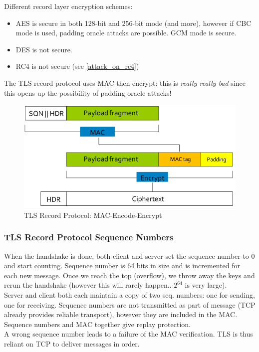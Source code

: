 \documentclass[11pt,oneside,a4paper]{article}
\begin{document}
Different record layer encryption schemes:

\vspace{-\topsep}
\begin{itemize}
	\setlength{\itemsep}{0pt}
	\setlength{\parskip}{0pt}
	\item AES is secure in both 128-bit and 256-bit mode (and more), however if CBC mode is used, padding oracle attacks are possible. GCM mode is secure.
	\item DES is not secure.
	\item RC4 is not secure (see \ref{attack_on_rc4})
\end{itemize}
\vspace{-\topsep}

The TLS record protocol uses MAC-then-encrypt: this is \textit{really really bad} since this opens up the possibility of padding oracle attacks!

\begin{figure}[hb]
	\centering
	\includegraphics[width=0.4\linewidth]{figures/tls_record_protocol}
	\caption{TLS Record Protocol: MAC-Encode-Encrypt}
	\label{fig:tlsrecordprotocol}
\end{figure}

\subsubsection{TLS Record Protocol Sequence Numbers}

When the handshake is done, both client and server set the sequence number to 0 and start counting. Sequence number is 64 bits in size and is incremented for each new message. Once we reach the top (overflow), we throw away the keys and rerun the handshake (however this will rarely happen.. $2^{64}$ is very large).\\
Server and client both each maintain a copy of two seq. numbers: one for sending, one for receiving. Sequence numbers are not transmitted as part of message (TCP already provides reliable transport), however they are included in the MAC. Sequence numbers and MAC together give replay protection.\\
A wrong sequence number leads to a failure of the MAC verification. TLS is thus reliant on TCP to deliver messages in order.
\end{document}
